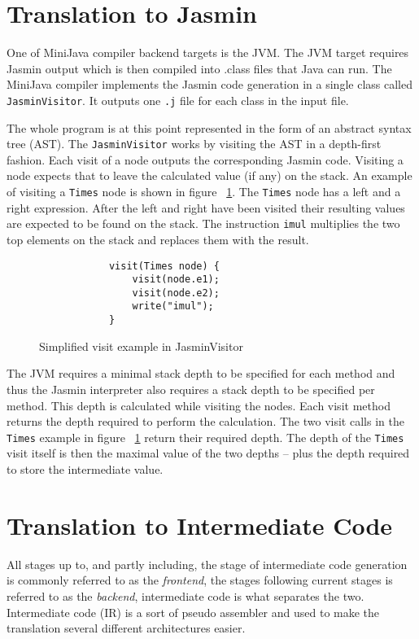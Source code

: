 \documentclass[11pt]{amsart}
\begin{document}
\section{Translation to Jasmin}
	One of MiniJava compiler backend targets is the JVM. The JVM target requires Jasmin\cite{jasmin} output which is then compiled into .class files that Java can run. The MiniJava compiler implements the Jasmin code generation in a single class called \texttt{JasminVisitor}. It outputs one \texttt{.j} file for each class in the input file.

	The whole program is at this point represented in the form of an abstract syntax tree (AST). The \texttt{JasminVisitor} works by visiting the AST in a depth-first fashion. Each visit of a node outputs the corresponding Jasmin code. Visiting a node expects that to leave the calculated value (if any) on the stack. An example of visiting a \texttt{Times} node is shown in figure ~\ref{fig:timesexample}. The \texttt{Times} node has a left and a right expression. After the left and right have been visited their resulting values are expected to be found on the stack. The instruction \texttt{imul} multiplies the two top elements on the stack and replaces them with the result.

	\begin{figure}
		\label{fig:timesexample}
		\begin{lstlisting}
			visit(Times node) {
				visit(node.e1);
				visit(node.e2);
				write("imul");
			}
		\end{lstlisting}
		\caption{Simplified visit example in JasminVisitor}
	\end{figure}

	The JVM requires a minimal stack depth to be specified for each method and thus the Jasmin interpreter also requires a stack depth to be specified per method. This depth is calculated while visiting the nodes. Each visit method returns the depth required to perform the calculation. The two visit calls in the \texttt{Times} example in figure ~\ref{fig:timesexample} return their required depth. The depth of the \texttt{Times} visit itself is then the maximal value of the two depths -- plus the depth required to store the intermediate value. 

\section{Translation to Intermediate Code}
All stages up to, and partly including, the stage of intermediate code generation is commonly referred to as the \textit{frontend}, the stages following current stages is referred to as the \textit{backend}, intermediate code is what separates the two. Intermediate code (IR) is a sort of pseudo assembler and used to make the translation several different architectures easier. 
\end{document}

